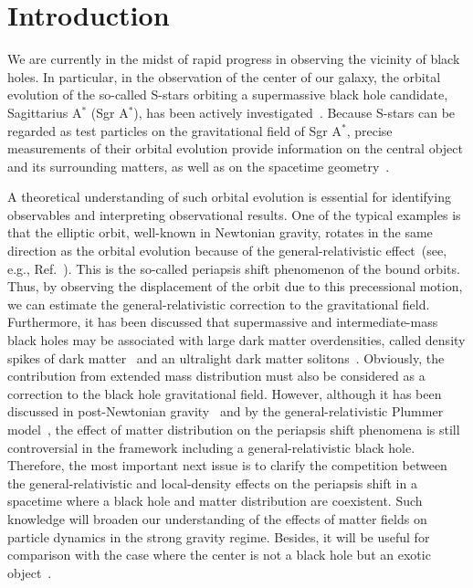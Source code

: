 \documentclass[aps,11pt,nofootinbib,preprintnumbers,groupedaddress,superscriptaddress]{revtex4-2}
\begin{document}
\section{Introduction}
\label{sec:1}
We are currently in the midst of rapid progress in observing the vicinity of black holes.
In particular, in the observation of the center of our galaxy, 
the orbital evolution of the so-called S-stars orbiting a supermassive black hole candidate, Sagittarius A$^\ast$ (Sgr A$^\ast$), has been actively investigated~\cite{Ghez:2000ay,Schodel:2002py}. 
Because S-stars can be regarded as test particles on the gravitational field of Sgr A$^\ast$,
precise measurements of their orbital evolution provide information on the central object and its surrounding matters, as well as on the spacetime geometry~\cite{Do:2019txf,Saida:2019mcz,Abuter:2020dou}. 


A theoretical understanding of such orbital evolution is essential for identifying observables and interpreting observational results. 
One of the typical examples is that the elliptic orbit, well-known in Newtonian gravity, rotates in the same direction as the orbital evolution because of the 
general-relativistic effect~(see, e.g., Ref.~\cite{Weinberg:1972}). 
This is the so-called 
periapsis shift phenomenon of the 
bound orbits. 
Thus, by observing the displacement of the orbit due to this precessional motion, we can estimate the general-relativistic correction to the gravitational field. 
Furthermore, it has been discussed that supermassive and intermediate-mass black holes may be associated with large dark matter overdensities, called density spikes of dark matter~\cite{Gondolo:1999ef, Bertone:2009kj, Sadeghian:2013laa, Lacroix:2018zmg} and an ultralight dark matter solitons~\cite{Bar:2019pnz}.
Obviously, the contribution from
extended mass distribution
must also be considered as a correction to the black hole gravitational field. 
However, although it has been discussed in post-Newtonian gravity~\cite{Rubilar:2001} and by the general-relativistic Plummer model~\cite{Igata:2022nkt}, the effect of matter distribution on the periapsis shift phenomena is still controversial in the framework including a 
general-relativistic black hole.
Therefore, the most important next 
issue is to clarify the competition between the 
general-relativistic and 
local-density effects on the 
periapsis shift in a spacetime where a black hole and matter distribution are 
coexistent.
Such knowledge will broaden our understanding of the effects of matter fields on particle dynamics in the strong gravity regime. Besides, it will be useful for comparison with the case where the center is not a black hole but an exotic object~\cite{Bini:2005dy,Bambhaniya:2021ybs,Ota:2021mub}.
\end{document}
